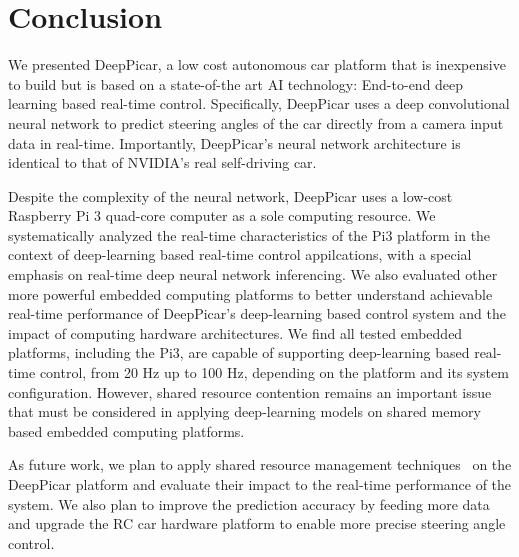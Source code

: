 \section{Conclusion}\label{sec:conclusion}
We presented DeepPicar, a low cost autonomous car platform that is
inexpensive to build but is based on a state-of-the art AI technology:
End-to-end deep learning based real-time control.
Specifically, DeepPicar uses a deep convolutional neural network to
predict steering angles of the car directly from a camera input data
in real-time. Importantly, DeepPicar's neural network architecture is
identical to that of NVIDIA's real self-driving car. 

Despite the complexity of the neural network, DeepPicar uses a
low-cost Raspberry Pi 3 quad-core computer as a sole computing
resource. We systematically analyzed the real-time characteristics of
the Pi3 platform in the context of deep-learning based real-time
control appilcations, with a special emphasis on real-time deep neural
network inferencing.
We also evaluated other more powerful embedded computing
platforms to better understand achievable real-time performance of
DeepPicar's deep-learning based control system and the impact of
computing hardware architectures.
We find all tested embedded platforms, including the Pi3, are capable
of supporting deep-learning based real-time control, from 20 Hz up to
100 Hz, depending on the platform and its system
configuration. However, shared resource contention remains an
important issue that must be considered in applying deep-learning
models on shared memory based embedded computing platforms.


As future work, we plan to apply shared resource management
techniques~\cite{Yun2013,yun2014rtas} on the DeepPicar platform and
evaluate their impact to the real-time performance of the system. We
also plan to improve the prediction accuracy by feeding more data and
upgrade the RC car hardware platform to enable more precise steering
angle control.

